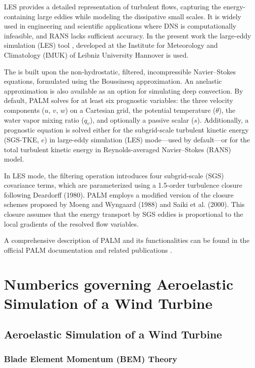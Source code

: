 LES provides a detailed representation of turbulent flows, capturing the energy-containing large eddies while modeling the dissipative small scales. It is widely used in engineering and scientific applications where DNS is computationally infeasible, and RANS lacks sufficient accuracy. In the present work the
large-eddy simulation (LES) tool  \cite{maronga2015}, developed at the Institute for Meteorology and
Climatology (IMUK) of Leibniz University Hannover is used. 

The  is built upon the non-hydrostatic, filtered, incompressible Navier–Stokes equations, formulated using the Boussinesq approximation. An anelastic approximation is also available as an option for simulating deep convection. By default, PALM solves for at least six prognostic variables: the three velocity components ($u$, $v$, $w$) on a Cartesian grid, the potential temperature ($\theta$), the water vapor mixing ratio ($q_v$), and optionally a passive scalar ($s$). Additionally, a prognostic equation is solved either for the subgrid-scale turbulent kinetic energy (SGS-TKE, $e$) in large-eddy simulation (LES) mode—used by default—or for the total turbulent kinetic energy in Reynolds-averaged Navier–Stokes (RANS) model.

In LES mode, the filtering operation introduces four subgrid-scale (SGS) covariance terms, which are parameterized using a 1.5-order turbulence closure following Deardorff (1980). PALM employs a modified version of the closure schemes proposed by Moeng and Wyngaard (1988) and Saiki et al. (2000). This closure assumes that the energy transport by SGS eddies is proportional to the local gradients of the resolved flow variables.

A comprehensive description of PALM and its functionalities can be found in the official PALM documentation and related publications\cite{maronga2015} \cite{raasch2001}.

\chapter{Numberics governing Aeroelastic Simulation of a Wind Turbine}
\section{Aeroelastic Simulation of a Wind Turbine}

\subsection{Blade Element Momentum (BEM) Theory} 
\label{sec:bem_theory}

